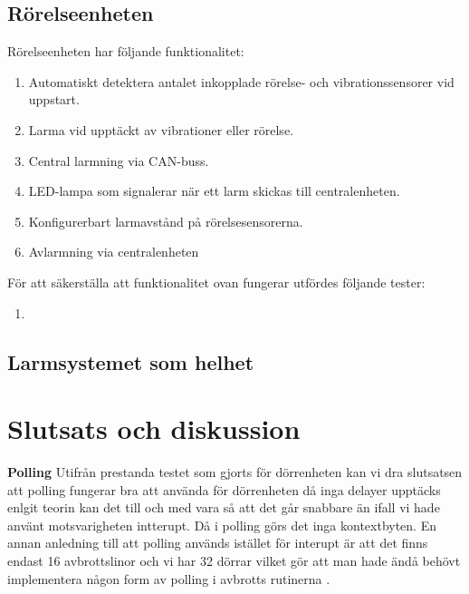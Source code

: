 \documentclass{article}
\begin{document}
 \subsection{Rörelseenheten}
 Rörelseenheten har följande funktionalitet:
 \begin{enumerate}
 	\item Automatiskt detektera antalet inkopplade rörelse- och vibrationssensorer vid uppstart.
	\item Larma vid upptäckt av vibrationer eller rörelse.
    \item Central larmning via CAN-buss.
	\item LED-lampa som signalerar när ett larm skickas till centralenheten.
	\item Konfigurerbart larmavstånd på rörelsesensorerna.
	\item Avlarmning via centralenheten
 \end{enumerate}
 För att säkerställa att funktionalitet ovan fungerar utfördes följande tester:
 \begin{enumerate}
     \item
 \end{enumerate}
 
 \subsection{Larmsystemet som helhet}
\section{Slutsats och diskussion}
\textbf{Polling} Utifrån prestanda testet som gjorts för dörrenheten 
kan vi dra slutsatsen att polling fungerar bra att använda för dörrenheten då inga delayer upptäcks
enlgit teorin kan det till och med vara så att det går snabbare än ifall vi hade använt 
motsvarigheten intterupt. Då i polling görs det inga kontextbyten. En annan anledning till
att polling används istället för interupt är att det finns endast 16 avbrottslinor och vi har 32 dörrar
vilket gör att man hade ändå behövt implementera någon form av polling i avbrotts rutinerna .




\end{document}

